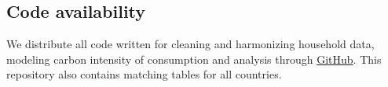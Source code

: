 \documentclass[12pt, a4paper]{article}
\begin{document}
\subsection{Code availability} \label{code}
We distribute all code written for cleaning and harmonizing household data, modeling carbon intensity of consumption and analysis through \href{https://github.com/lmissbach/Carbon-Intensity-2023}{GitHub}. This repository also contains matching tables for all countries.
\end{document}
